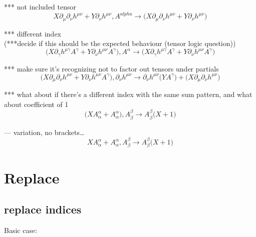 \documentclass{article}
\def\){\Big)}
\def\({\Big(}
\begin{document}
*** not included tensor\\

\begin{equation}
X \partial_{\mu} \partial_{\nu}h^{\mu \nu} +Y \partial_{\nu}h^{\mu \nu}  , A^{alpha} \rightarrow
\(X \partial_{\mu}\partial_{\nu}h^{\mu \nu} +Y \partial_{\nu}h^{\mu \nu} \)
\end{equation}


*** different index\\

(***decide if this should be the expected behaviour (tensor logic question)) 
\begin{equation}
\(X \partial_{\gamma}h^{\mu \gamma} A^{\gamma} +Y \partial_{\nu}h^{\mu \nu} A^{\gamma} \), A^{\alpha} \rightarrow 
\(X \partial_{\gamma}h^{\mu \gamma} A^{\gamma} +Y \partial_{\nu}h^{\mu \nu} A^{\gamma} \)
\end{equation}

*** make sure it’s recognizing not to factor out tensors under partials\\
\begin{equation}
\(X \partial_{\mu} \partial_{\nu}h^{\mu \nu} +Y \partial_{\nu}h^{\mu \nu} A^{\gamma} \), \partial_{\nu}h^{\mu \nu} \rightarrow
\partial_{\nu}h^{\mu \nu} \(Y A^{\gamma} \)+\(X \partial_{\mu}\partial_{\nu}h^{\mu \nu} \)
\end{equation}

*** what about if there’s a different index with the same sum pattern, and what about coefficient of 1\\
\begin{equation}
\(X A^{\alpha}_{\alpha} + A^{\alpha}_{\alpha}\) , A^{\beta}_{\beta} \rightarrow
A_{\beta}^{\beta} \(X +1 \)
\end{equation}


— variation, no brackets…\\
\begin{equation}
X A^{\alpha}_{\alpha} + A^{\alpha}_{\alpha} , A^{\beta}_{\beta} \rightarrow
A_{\beta}^{\beta} \(X +1 \)
\end{equation}

\section{Replace}
\subsection{replace indices}

Basic case:\\
\end{document}
